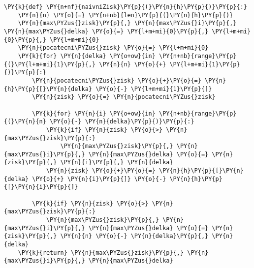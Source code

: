 \begin{Verbatim}[commandchars=\\\{\}]
\PY{k}{def} \PY{n+nf}{naivniZisk}\PY{p}{(}\PY{n}{h}\PY{p}{)}\PY{p}{:}
	\PY{n}{n} \PY{o}{=} \PY{n+nb}{len}\PY{p}{(}\PY{n}{h}\PY{p}{)}
	\PY{n}{max\PYZus{}zisk}\PY{p}{,} \PY{n}{max\PYZus{}i}\PY{p}{,} \PY{n}{max\PYZus{}delka} \PY{o}{=} \PY{l+m+mi}{0}\PY{p}{,} \PY{l+m+mi}{0}\PY{p}{,} \PY{l+m+mi}{0}
	\PY{n}{pocatecni\PYZus{}zisk} \PY{o}{=} \PY{l+m+mi}{0}
	\PY{k}{for} \PY{n}{delka} \PY{o+ow}{in} \PY{n+nb}{range}\PY{p}{(}\PY{l+m+mi}{1}\PY{p}{,} \PY{n}{n} \PY{o}{+} \PY{l+m+mi}{1}\PY{p}{)}\PY{p}{:}
		\PY{n}{pocatecni\PYZus{}zisk} \PY{o}{+}\PY{o}{=} \PY{n}{h}\PY{p}{[}\PY{n}{delka} \PY{o}{-} \PY{l+m+mi}{1}\PY{p}{]}
		\PY{n}{zisk} \PY{o}{=} \PY{n}{pocatecni\PYZus{}zisk}

		\PY{k}{for} \PY{n}{i} \PY{o+ow}{in} \PY{n+nb}{range}\PY{p}{(}\PY{n}{n} \PY{o}{-} \PY{n}{delka}\PY{p}{)}\PY{p}{:}
			\PY{k}{if} \PY{n}{zisk} \PY{o}{>} \PY{n}{max\PYZus{}zisk}\PY{p}{:}
				\PY{n}{max\PYZus{}zisk}\PY{p}{,} \PY{n}{max\PYZus{}i}\PY{p}{,} \PY{n}{max\PYZus{}delka} \PY{o}{=} \PY{n}{zisk}\PY{p}{,} \PY{n}{i}\PY{p}{,} \PY{n}{delka}
			\PY{n}{zisk} \PY{o}{+}\PY{o}{=} \PY{n}{h}\PY{p}{[}\PY{n}{delka} \PY{o}{+} \PY{n}{i}\PY{p}{]} \PY{o}{-} \PY{n}{h}\PY{p}{[}\PY{n}{i}\PY{p}{]}

		\PY{k}{if} \PY{n}{zisk} \PY{o}{>} \PY{n}{max\PYZus{}zisk}\PY{p}{:}
			\PY{n}{max\PYZus{}zisk}\PY{p}{,} \PY{n}{max\PYZus{}i}\PY{p}{,} \PY{n}{max\PYZus{}delka} \PY{o}{=} \PY{n}{zisk}\PY{p}{,} \PY{n}{n} \PY{o}{-} \PY{n}{delka}\PY{p}{,} \PY{n}{delka}
	\PY{k}{return} \PY{n}{max\PYZus{}zisk}\PY{p}{,} \PY{n}{max\PYZus{}i}\PY{p}{,} \PY{n}{max\PYZus{}delka}
\end{Verbatim}
